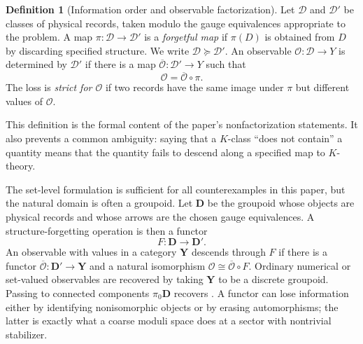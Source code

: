 \documentclass[11pt]{article}
\theoremstyle{definition}
\newtheorem{definition}[theorem]{Definition}
\theoremstyle{remark}
\begin{document}
\begin{definition}[Information order and observable factorization]
\label{def:information-order}
Let \(\mathcal D\) and \(\mathcal D'\) be classes of physical records, taken
modulo the gauge equivalences appropriate to the problem.  A map
\(\pi:\mathcal D\to\mathcal D'\) is a \emph{forgetful map} if
\(\pi(D)\) is obtained from \(D\) by discarding specified structure.  We
write \(\mathcal D\succeq\mathcal D'\).  An observable
\(\mathcal O:\mathcal D\to Y\) is determined by \(\mathcal D'\) if there is a
map \(\overline{\mathcal O}:\mathcal D'\to Y\) such that
\[
                    \mathcal O=\overline{\mathcal O}\circ\pi .
\]
The loss is \emph{strict for \(\mathcal O\)} if two records have the same
image under \(\pi\) but different values of \(\mathcal O\).
\end{definition}

This definition is the formal content of the paper's nonfactorization
statements.  It also prevents a common ambiguity: saying that a \(K\)-class
``does not contain'' a quantity means that the quantity fails to descend
along a specified map to \(K\)-theory.

The set-level formulation is sufficient for all counterexamples in this
paper, but the natural domain is often a groupoid.  Let \(\mathbf D\) be the
groupoid whose objects are physical records and whose arrows are the chosen
gauge equivalences.  A structure-forgetting operation is then a functor
\[
                       F:\mathbf D\longrightarrow\mathbf D'.
\]
An observable with values in a category \(\mathbf Y\) descends through \(F\)
if there is a functor
\(\overline{\mathcal O}:\mathbf D'\to\mathbf Y\) and a natural isomorphism
\(\mathcal O\cong\overline{\mathcal O}\circ F\).  Ordinary numerical or
set-valued observables are recovered by taking \(\mathbf Y\) to be a discrete
groupoid.  Passing to connected components
\(\pi_0\mathbf D\) recovers .  A functor can lose
information either by identifying nonisomorphic objects or by erasing
automorphisms; the latter is exactly what a coarse moduli space does at a
sector with nontrivial stabilizer.
\end{document}
